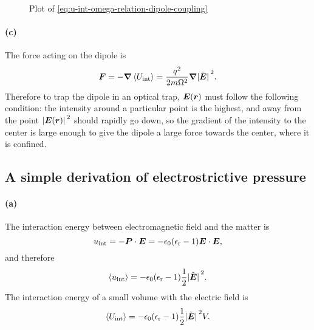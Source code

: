\documentclass[hyperref, a4paper]{article}
\newcommand{\epsr}{\epsilon_{\text{r}}}
\begin{document}
\begin{figure}
    \centering
    
    \caption{Plot of \eqref{eq:u-int-omega-relation-dipole-coupling}}
    \label{fig:u-int-omega-relation-dipole-coupling}
\end{figure}

\paragraph{(c)} The force acting on the dipole is
\begin{equation}
    \vb*{F} = - \grad{\expval*{U_{\text{int}}}}
    = \frac{q^2}{2 m \Omega^2} \grad{\abs*{\tilde{\vb*{E}}}^2}.
\end{equation}
Therefore to trap the dipole in an optical trap, 
$\vb*{E}(\vb*{r})$ must follow the following condition:
the intensity around a particular point is the highest, 
and away from the point $\abs*{\vb*{E}(\vb*{r})}^2$ 
should rapidly go down,
so the gradient of the intensity to the center is large enough 
to give the dipole a large force towards the center, 
where it is confined.

\subsection{A simple derivation of electrostrictive pressure}

\paragraph{(a)}
The interaction energy between electromagnetic field and the matter is 
\begin{equation}
    u_{\text{int}} = - \vb*{P} \cdot \vb*{E}
    = - \epsilon_0 (\epsr - 1) \vb*{E} \cdot \vb*{E},
\end{equation}
and therefore 
\begin{equation}
    \expval{u_{\text{int}}} = - \epsilon_0 (\epsr - 1) \frac{1}{2} \abs*{\tilde{\vb*{E}}}^2.
\end{equation}
The interaction energy of a small volume with the electric field is 
\begin{equation}
    \expval{U_{\text{int}}} = - \epsilon_0 (\epsr - 1) \frac{1}{2} \abs*{\tilde{\vb*{E}}}^2 V.
\end{equation}
\end{document}
